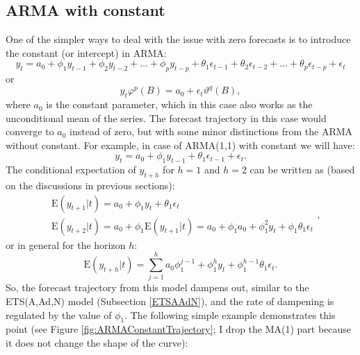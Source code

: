 \documentclass[]{book}
\theoremstyle{definition}
\theoremstyle{definition}
\theoremstyle{definition}
\theoremstyle{definition}
\theoremstyle{remark}
\begin{document}
\hypertarget{ARMAConstant}{%
\subsection{ARMA with constant}\label{ARMAConstant}}

One of the simpler ways to deal with the issue with zero forecasts is to introduce the constant (or intercept) in ARMA:
\begin{equation}
  {y}_{t} = a_0 + \phi_1 y_{t-1} + \phi_2 y_{t-2} + \dots + \phi_p y_{t-p} + \theta_1 \epsilon_{t-1} + \theta_2 \epsilon_{t-2} + \dots + \theta_p \epsilon_{t-p} + \epsilon_t 
  \label{eq:ARIMAp0qExample}
\end{equation}
or
\begin{equation}
  {y}_{t} \varphi^p(B) = a_0 + \epsilon_t \vartheta^q(B) ,
  \label{eq:ARIMAp0qCompactConstant}
\end{equation}
where \(a_0\) is the constant parameter, which in this case also works as the unconditional mean of the series. The forecast trajectory in this case would converge to \(a_0\) instead of zero, but with some minor distinctions from the ARMA without constant. For example, in case of ARMA(1,1) with constant we will have:
\begin{equation}
  {y}_{t} = a_0 + \phi_1 y_{t-1} + \theta_1 \epsilon_{t-1} + \epsilon_t .
  \label{eq:ARIMA101ConstExample01}
\end{equation}
The conditional expectation of \(y_{t+h}\) for \(h=1\) and \(h=2\) can be written as (based on the discussions in previous sections):
\begin{equation}
\begin{aligned}
  & \mathrm{E}({y}_{t+1}|t) = a_0 + \phi_1 y_{t} + \theta_1 \epsilon_{t} \\
  & \mathrm{E}({y}_{t+2}|t) = a_0 + \phi_1 \mathrm{E}(y_{t+1}|t) = a_0 + \phi_1 a_0 + \phi_1^2 y_{t} + \phi_1 \theta_1 \epsilon_t
\end{aligned} ,
  \label{eq:ARIMA101ConstExampleForecasth1}
\end{equation}
or in general for the horizon \(h\):
\begin{equation}
  \mathrm{E}({y}_{t+h}|t) = \sum_{j=1}^h a_0\phi_1^{j-1} + \phi_1^h y_{t} + \phi_1^{h-1} \theta_1 \epsilon_{t} .
  \label{eq:ARIMA101ConstExampleForecast}
\end{equation}
So, the forecast trajectory from this model dampens out, similar to the ETS(A,Ad,N) model (Subsection \ref{ETSAAdN}), and the rate of dampening is regulated by the value of \(\phi_1\). The following simple example demonstrates this point (see Figure \ref{fig:ARMAConstantTrajectory}; I drop the MA(1) part because it does not change the shape of the curve):
\end{document}
